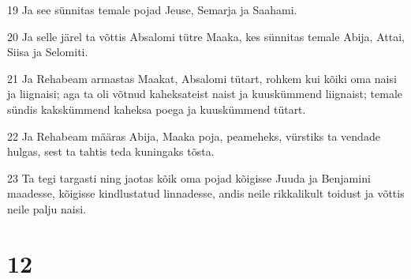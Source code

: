 \par 19 Ja see sünnitas temale pojad Jeuse, Semarja ja Saahami.
\par 20 Ja selle järel ta võttis Absalomi tütre Maaka, kes sünnitas temale Abija, Attai, Siisa ja Selomiti.
\par 21 Ja Rehabeam armastas Maakat, Absalomi tütart, rohkem kui kõiki oma naisi ja liignaisi; aga ta oli võtnud kaheksateist naist ja kuuskümmend liignaist; temale sündis kakskümmend kaheksa poega ja kuuskümmend tütart.
\par 22 Ja Rehabeam määras Abija, Maaka poja, peameheks, vürstiks ta vendade hulgas, sest ta tahtis teda kuningaks tõsta.
\par 23 Ta tegi targasti ning jaotas kõik oma pojad kõigisse Juuda ja Benjamini maadesse, kõigisse kindlustatud linnadesse, andis neile rikkalikult toidust ja võttis neile palju naisi.

\chapter{12}

